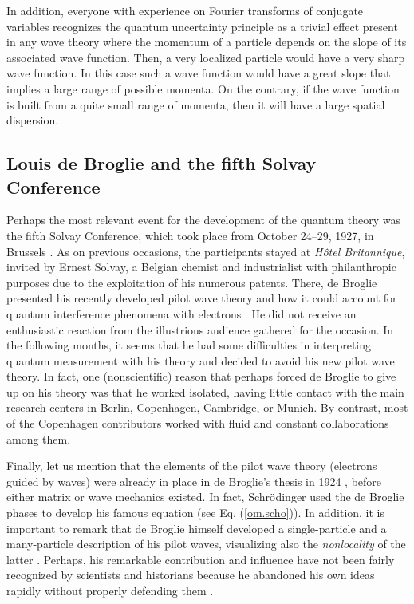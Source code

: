 \documentclass[nofootinbib, secnumarabic, amsmath, nobibnotes,11pt,aps,pra, floatfix]{revtex4-1}
\newcommand{\eref}[1]{Eq. (\ref{#1})}
\begin{document}
In addition, everyone with experience on Fourier transforms of
conjugate variables recognizes the quantum uncertainty principle as
a trivial effect present in any wave theory where the momentum of a
particle depends on the slope of its associated wave function. Then,
a very localized particle would have a very sharp wave function.
In this case such a wave function would have a great slope that implies
a large range of possible momenta. On the contrary, if the wave
function is built from a quite small range of momenta, then it will
have a large spatial dispersion.


\subsection{Louis de Broglie and the fifth Solvay Conference}\label{om.sec_intro.5}

Perhaps the most relevant event for the development of the quantum
theory was the fifth Solvay Conference, which took place from
October 24--29, 1927, in Brussels \cite{om.valentini2009Solvay}. As
on previous occasions, the participants stayed at \textit{H\^{o}tel
Britannique}, invited by Ernest Solvay, a Belgian chemist and
industrialist with philanthropic purposes due to the exploitation of
his numerous patents. There, de Broglie presented his recently
developed pilot wave theory and how it could account for quantum
interference phenomena with electrons \cite{om.valentini2009Solvay}.
He did not receive an enthusiastic reaction from the illustrious
audience gathered for the occasion. In the following months, it
seems that he had some difficulties in interpreting quantum
measurement with his theory and decided to avoid his new pilot wave theory. In fact, one
(nonscientific) reason that perhaps forced de Broglie to give up on his
theory was that he worked isolated, having little contact with the
main research centers in Berlin, Copenhagen, Cambridge, or Munich.
By contrast, most of the Copenhagen contributors worked with fluid
and constant collaborations among them.

Finally, let us mention that the elements of the pilot wave theory
(electrons guided by waves) were already in place in de Broglie's
thesis in 1924 \cite{om.debroglie1923}, before either matrix or wave
mechanics existed. In fact, Schr\"odinger used the de Broglie phases
to develop his famous equation (see \eref{om.scho}). In addition, it
is important to remark that de Broglie himself developed a
single-particle and a many-particle description of his pilot waves,
visualizing also the \textit{nonlocality} of the latter
\cite{om.valentini2009Solvay}. Perhaps, his remarkable contribution
and influence have not been fairly recognized by scientists and
historians because he abandoned his own ideas rapidly without properly
defending them \cite{om.valentini2009Solvay,om.Broglie1956}.
\end{document}

